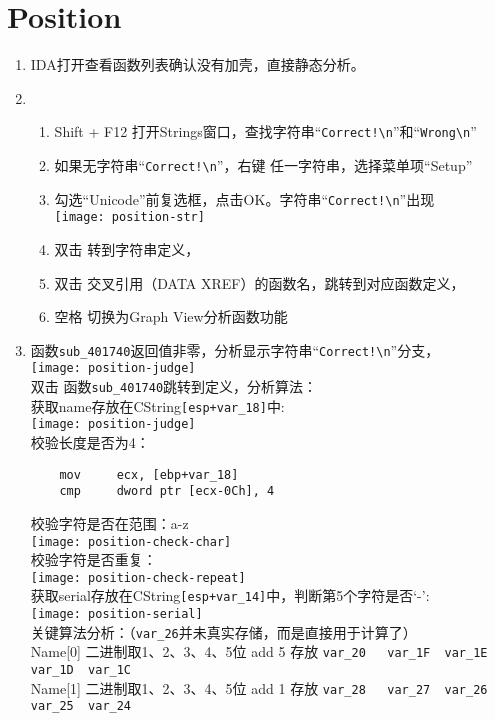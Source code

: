 \section{Position}
\begin{enumerate}
\item IDA打开查看函数列表确认没有加壳，直接静态分析。\\
\item 
	\begin{enumerate}
	\item Shift + F12 打开Strings窗口，查找字符串“\lstinline$Correct!\n$”和“\lstinline$Wrong\n$”\\
	\item 如果无字符串“\lstinline$Correct!\n$”，右键 任一字符串，选择菜单项“Setup”\\
	\item 勾选“Unicode”前复选框，点击OK。字符串“\lstinline$Correct!\n$”出现\\
		\texttt{[image: position-str]} \\
	\item 双击 转到字符串定义，\\
	\item 双击 交叉引用（DATA XREF）的函数名，跳转到对应函数定义，\\
	\item 空格 切换为Graph View分析函数功能 \\
	\end{enumerate} 
\item 
	 函数\lstinline$sub_401740$返回值非零，分析显示字符串“\lstinline$Correct!\n$”分支，\\
	\texttt{[image: position-judge]} \\
	双击 函数\lstinline$sub_401740$跳转到定义，分析算法： \\
	获取name存放在CString\lstinline$[esp+var_18]$中:\\
	\texttt{[image: position-judge]} \\
	校验长度是否为4：\\
	\begin{lstlisting}
	mov     ecx, [ebp+var_18]
	cmp     dword ptr [ecx-0Ch], 4
	\end{lstlisting}
	校验字符是否在范围：a-z \\
	\texttt{[image: position-check-char]} \\
	校验字符是否重复：\\
	\texttt{[image: position-check-repeat]} \\
	获取serial存放在CString\lstinline$[esp+var_14]$中，判断第5个字符是否‘-’:\\
	\texttt{[image: position-serial]} \\
	关键算法分析：（\lstinline$var_26$并未真实存储，而是直接用于计算了）\\
Name[0]		二进制取1、2、3、4、5位 add 5 存放	\lstinline$var_20	var_1F	var_1E	var_1D	var_1C$\\
Name[1]		二进制取1、2、3、4、5位 add 1 存放	\lstinline$var_28	var_27	var_26	var_25	var_24$\\


\end{enumerate}
